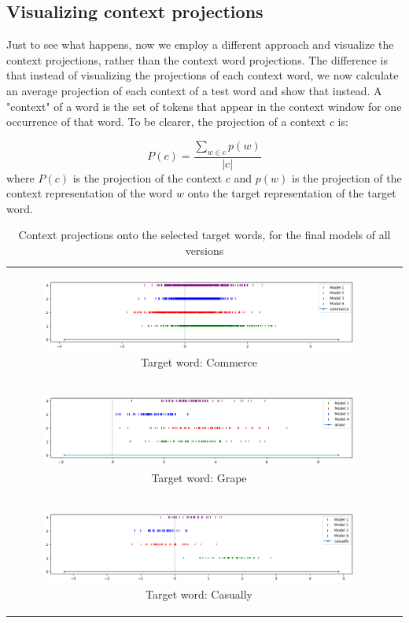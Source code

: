 \subsection{Visualizing context projections}

Just to see what happens, now we employ a different approach and visualize the context projections, rather than the context word projections. The difference is that instead of visualizing the projections of each context word, we now calculate an average projection of each context of a test word and show that instead. A "context" of a word is the set of tokens that appear in the context window for one occurrence of that word. To be clearer, the projection of a context $c$ is:

\[
P(c) = \frac{\sum_{w \in c} p(w)}{|c|}
\]
\noindent
where $P(c)$ is the projection of the context $c$ and $p(w)$ is the projection of the context representation of the word $w$ onto the target representation of the target word.

\begin{table}[p]
  \centering
  \begin{tabular}{cc}
    \begin{subfigure}{0.95\textwidth}
      \includegraphics[width=\linewidth]{img/context_commerce.png}
      \caption{Target word: Commerce}
    \end{subfigure} \\
    \begin{subfigure}{0.95\textwidth}
      \includegraphics[width=\linewidth]{img/context_grape.png}
      \caption{Target word: Grape}
    \end{subfigure} \\
    \begin{subfigure}{0.95\textwidth}
      \includegraphics[width=\linewidth]{img/context_casually.png}
      \caption{Target word: Casually}
    \end{subfigure}
  \end{tabular}
  \caption{Context projections onto the selected target words, for the final models of all versions}
  \label{tab:context_proj}
\end{table}

